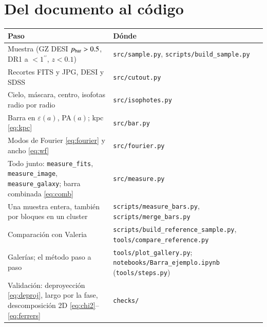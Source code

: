 \documentclass[11pt,a4paper]{article}
\newcommand{\as}{\ensuremath{^{\prime\prime}}}
\newcommand{\code}[1]{\texttt{#1}}
\begin{document}
\section{Del documento al código}\label{sec:codigo}

\begin{table}[h]
\centering
\small
\begin{tabularx}{\textwidth}{lX}
\toprule
Paso & Dónde \\
\midrule
Muestra (GZ DESI $p_{\rm bar} > 0.5$, DR1 a $< 1\as$, $z < 0.1$) & \code{src/sample.py}, \code{scripts/build\_sample.py} \\
Recortes FITS y JPG, DESI y SDSS & \code{src/cutout.py} \\
Cielo, máscara, centro, isofotas radio por radio & \code{src/isophotes.py} \\
Barra en $\varepsilon(a)$, PA$(a)$; kpc \eqref{eq:kpc} & \code{src/bar.py} \\
Modos de Fourier \eqref{eq:fourier} y ancho \eqref{eq:wf} & \code{src/fourier.py} \\
Todo junto: \code{measure\_fits}, \code{measure\_image}, \code{measure\_galaxy}; barra combinada \eqref{eq:comb} & \code{src/measure.py} \\
Una muestra entera, también por bloques en un cluster & \code{scripts/measure\_bars.py}, \code{scripts/merge\_bars.py} \\
Comparación con Valeria & \code{scripts/build\_reference\_sample.py}, \code{tools/compare\_reference.py} \\
Galerías; el método paso a paso & \code{tools/plot\_gallery.py}; \code{notebooks/Barra\_ejemplo.ipynb} (\code{tools/steps.py}) \\
Validación: deproyección \eqref{eq:deproj}, largo por la fase, descomposición 2D \eqref{eq:chi2}--\eqref{eq:ferrers} & \code{checks/} \\
\bottomrule
\end{tabularx}
\end{table}

\clearpage
\end{document}
